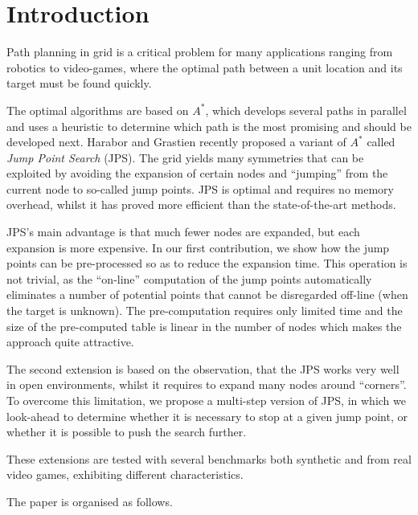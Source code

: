 \section{Introduction}

Path planning in grid is a critical problem for many applications 
ranging from robotics to video-games, 
where the optimal path 
between a unit location and its target must be found quickly.  

The optimal algorithms are based on $A^*$, 
which develops several paths in parallel 
and uses a heuristic to determine 
which path is the most promising 
and should be developed next.  
Harabor and Grastien \cite{harabor11b} recently proposed 
a variant of $A^*$ called \emph{Jump Point Search} (JPS).  
The grid yields many symmetries that can be exploited 
by avoiding the expansion of certain nodes 
and ``jumping'' from the current node to so-called jump points.  
JPS is optimal and requires no memory overhead, 
whilst it has proved more efficient 
than the state-of-the-art methods.  

JPS's main advantage is that much fewer nodes are expanded, 
but each expansion is more expensive.  
In our first contribution, we show 
how the jump points can be pre-processed 
so as to reduce the expansion time.  
This operation is not trivial, 
as the ``on-line'' computation of the jump points 
automatically eliminates a number of potential points 
that cannot be disregarded off-line (when the target is unknown).  
The pre-computation requires only limited time 
and the size of the pre-computed table is linear in the number of nodes 
which makes the approach quite attractive.  

The second extension is based on the observation, 
that the JPS works very well in open environments, 
whilst it requires to expand many nodes around ``corners''.  
To overcome this limitation, 
we propose a multi-step version of JPS, 
in which we look-ahead to determine 
whether it is necessary to stop at a given jump point, 
or whether it is possible to push the search further.  

These extensions are tested with several benchmarks 
both synthetic and from real video games, 
exhibiting different characteristics.  

The paper is organised as follows.  


